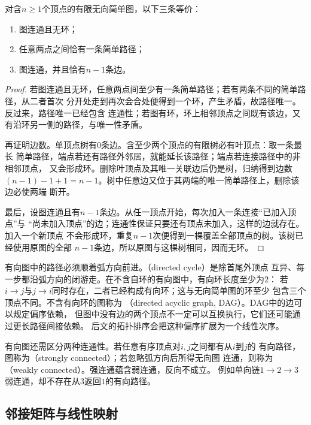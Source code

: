 \begin{theorem}[树的等价刻画]
  \label{thm:graph-theory-tree-characterizations}
  对含\(n\geq1\)个顶点的有限无向简单图，以下三条等价：
  \begin{enumerate}
    \item 图连通且无环；
    \item 任意两点之间恰有一条简单路径；
    \item 图连通，并且恰有\(n-1\)条边。
  \end{enumerate}
\end{theorem}

\begin{proof}
若图连通且无环，任意两点间至少有一条简单路径；若有两条不同的简单路径，从二者首次
分开处走到再次会合处便得到一个环，产生矛盾，故路径唯一。反过来，路径唯一已经包含
连通性；若图有环，环上相邻顶点之间既有该边，又有沿环另一侧的路径，与唯一性矛盾。

再证明边数。单顶点树有\(0\)条边。含至少两个顶点的有限树必有叶顶点：取一条最长
简单路径，端点若还有路径外邻居，就能延长该路径；端点若连接路径中的非相邻顶点，
又会形成环。删除叶顶点及其唯一关联边后仍是树，归纳得到边数
\((n-1)-1+1=n-1\)。树中任意边又位于其两端的唯一简单路径上，删除该边必使两端
断开。

最后，设图连通且有\(n-1\)条边。从任一顶点开始，每次加入一条连接“已加入顶点”与
“尚未加入顶点”的边；连通性保证只要还有顶点未加入，这样的边就存在。加入一个新顶点
不会形成环，重复\(n-1\)次便得到一棵覆盖全部顶点的树。该树已经使用原图的全部
\(n-1\)条边，所以原图与这棵树相同，因而无环。
\end{proof}

有向图中的路径必须顺着弧方向前进。（directed cycle）是除首尾外顶点
互异、每一步都沿弧方向的闭游走。在不含自环的有向图中，有向环长度至少为\(2\)：
若\(i\to j\)与\(j\to i\)同时存在，二者已经构成有向环；这与无向简单图的环至少
包含三个顶点不同。不含有向环的图称为
（directed acyclic graph, DAG）。DAG中的边可以规定偏序依赖，
但图中没有边的两个顶点不一定可以互换执行，它们还可能通过更长路径间接依赖。
后文的拓扑排序会把这种偏序扩展为一个线性次序。

有向图还需区分两种连通性。若任意有序顶点对\(i,j\)之间都有从\(i\)到\(j\)的
有向路径，图称为（strongly connected）；若忽略弧方向后所得无向图
连通，则称为（weakly connected）。强连通蕴含弱连通，反向不成立。
例如单向链\(1\to2\to3\)弱连通，却不存在从\(3\)返回\(1\)的有向路径。

\subsection{邻接矩阵与线性映射}

